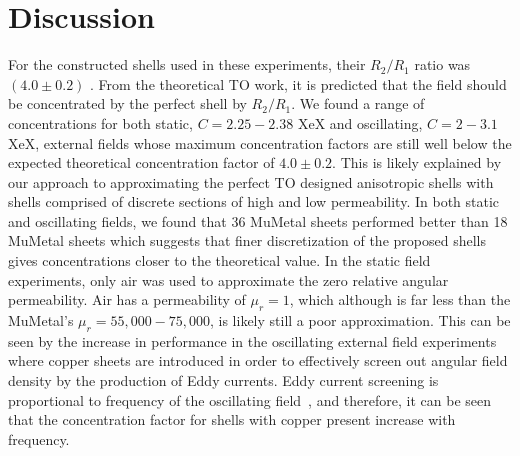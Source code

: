 \documentclass[11pt]{iopart}
\begin{document}
\section{Discussion}

For the constructed shells used in these experiments, their $R_2/R_1$
ratio was $(4.0\pm0.2)$ . From the theoretical TO work, it is
predicted that the field should be concentrated by the perfect shell
by $R_2/R_1$. We found a range of concentrations for both static, $C =
2.25 - 2.38$ XeX and oscillating, $C = 2 - 3.1$ XeX, external fields
whose maximum concentration factors are still well below the expected
theoretical concentration factor of $4.0 \pm 0.2$. This is likely
explained by our approach to approximating the perfect TO designed
anisotropic shells with shells comprised of discrete sections of high
and low permeability.  In both static and oscillating fields, we found
that 36 MuMetal sheets performed better than 18 MuMetal sheets which
suggests that finer discretization of the proposed shells gives
concentrations closer to the theoretical value. In the static field
experiments, only air was used to approximate the zero relative
angular permeability. Air has a permeability of $\mu_r = 1$, which
although is far less than the MuMetal's $\mu_r = 55,000-75,000 $, is
likely still a poor approximation. This can be seen by the increase in
performance in the oscillating external field experiments where copper
sheets are introduced in order to effectively screen out angular field
density by the production of Eddy currents. Eddy current screening is
proportional to frequency of the oscillating field~\cite{XXX}, and
therefore, it can be seen that the concentration factor for shells
with copper present increase with frequency. \\

\end{document}
